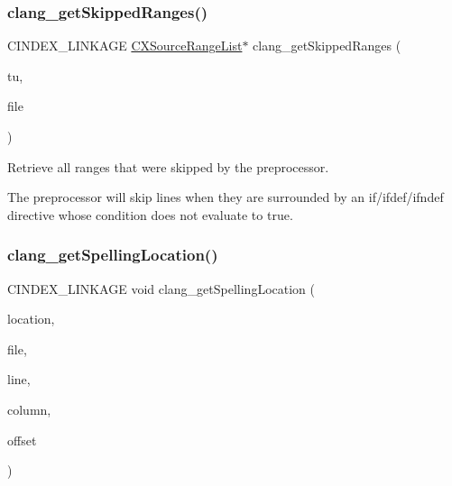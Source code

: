 \subsubsection{\texorpdfstring{clang\+\_\+get\+Skipped\+Ranges()}{clang\_getSkippedRanges()}}
{\footnotesize\ttfamily C\+I\+N\+D\+E\+X\+\_\+\+L\+I\+N\+K\+A\+GE \mbox{\hyperlink{structCXSourceRangeList}{C\+X\+Source\+Range\+List}}$\ast$ clang\+\_\+get\+Skipped\+Ranges (\begin{DoxyParamCaption}\item[{\mbox{\hyperlink{group__CINDEX_gacdb7815736ca709ce9a5e1ec2b7e16ac}{C\+X\+Translation\+Unit}}}]{tu,  }\item[{\mbox{\hyperlink{group__CINDEX__FILES_gacfcea9c1239c916597e2e5b3e109215a}{C\+X\+File}}}]{file }\end{DoxyParamCaption})}



Retrieve all ranges that were skipped by the preprocessor. 

The preprocessor will skip lines when they are surrounded by an if/ifdef/ifndef directive whose condition does not evaluate to true. \mbox{\label{group__CINDEX__LOCATIONS_ga01f1a342f7807ea742aedd2c61c46fa0}} 
\subsubsection{\texorpdfstring{clang\+\_\+get\+Spelling\+Location()}{clang\_getSpellingLocation()}}
{\footnotesize\ttfamily C\+I\+N\+D\+E\+X\+\_\+\+L\+I\+N\+K\+A\+GE void clang\+\_\+get\+Spelling\+Location (\begin{DoxyParamCaption}\item[{\mbox{\hyperlink{structCXSourceLocation}{C\+X\+Source\+Location}}}]{location,  }\item[{\mbox{\hyperlink{group__CINDEX__FILES_gacfcea9c1239c916597e2e5b3e109215a}{C\+X\+File}} $\ast$}]{file,  }\item[{unsigned $\ast$}]{line,  }\item[{unsigned $\ast$}]{column,  }\item[{unsigned $\ast$}]{offset }\end{DoxyParamCaption})}



